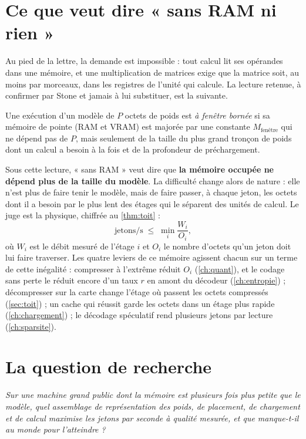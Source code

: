 \section{Ce que veut dire « sans RAM ni rien »}\label{sec:lecture}

Au pied de la lettre, la demande est impossible : tout calcul lit ses opérandes dans une mémoire, et une multiplication de matrices exige que la matrice soit, au moins par morceaux, dans les registres de l'unité qui calcule. La lecture retenue, à confirmer par Stone et jamais à lui substituer, est la suivante.

\begin{definition}\label{def:fenetre}
Une exécution d'un modèle de $P$ octets de poids est \emph{à fenêtre bornée} si sa mémoire de pointe (RAM et VRAM) est majorée par une constante $M_{\text{fenêtre}}$ qui ne dépend pas de $P$, mais seulement de la taille du plus grand tronçon de poids dont un calcul a besoin à la fois et de la profondeur de préchargement.
\end{definition}

Sous cette lecture, « sans RAM » veut dire que \textbf{la mémoire occupée ne dépend plus de la taille du modèle}. La difficulté change alors de nature : elle n'est plus de faire tenir le modèle, mais de faire passer, à chaque jeton, les octets dont il a besoin par le plus lent des étages qui le séparent des unités de calcul. Le juge est la physique, chiffrée au \cref{thm:toit} :
\[
\text{jetons/s} \;\le\; \min_i \frac{W_i}{O_i},
\]
où $W_i$ est le débit mesuré de l'étage $i$ et $O_i$ le nombre d'octets qu'un jeton doit lui faire traverser. Les quatre leviers de ce mémoire agissent chacun sur un terme de cette inégalité : compresser à l'extrême réduit $O_i$ (\cref{ch:quant}), et le codage sans perte le réduit encore d'un taux $r$ en amont du décodeur (\cref{ch:entropie}) ; décompresser sur la carte change l'étage où passent les octets compressés (\cref{sec:toit}) ; un cache qui réussit garde les octets dans un étage plus rapide (\cref{ch:chargement}) ; le décodage spéculatif rend plusieurs jetons par lecture (\cref{ch:sparsite}).

\section{La question de recherche}

\begin{center}
\begin{tcolorbox}[enhanced, width=0.92\linewidth, colback=Fond, colframe=Accent, boxrule=0.6pt, arc=1pt]
\emph{Sur une machine grand public dont la mémoire est plusieurs fois plus petite que le modèle, quel assemblage de représentation des poids, de placement, de chargement et de calcul maximise les jetons par seconde à qualité mesurée, et que manque-t-il au monde pour l'atteindre ?}
\end{tcolorbox}
\end{center}

